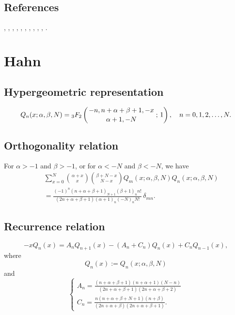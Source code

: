 \documentclass[envcountchap,graybox]{svmono}
\newcommand{\hyp}[5]{\mbox{}_{#1}{F}_{#2}
\left(\genfrac{}{}{0pt}{}{#3}{#4}\,;\,#5\right)}
\begin{document}
\subsection*{References}
\cite{Askey85}, \cite{Askey89I}, \cite{AtakRahmanSuslov},
\cite{AtakSuslov85}, \cite{Badertscher}, \cite{Gupta91}, \cite{Koelink96II},
\cite{Koorn88}, \cite{Lesky94II}, \cite{Lesky95II}, \cite{Lesky97}.


\section{Hahn}

\par\setcounter{equation}{0}

\subsection*{Hypergeometric representation}
\begin{equation}
\label{DefHahn}
Q_n(x;\alpha,\beta,N)=\hyp{3}{2}{-n,n+\alpha+\beta+1,-x}{\alpha+1,-N}{1},\quad n=0,1,2,\ldots,N.
\end{equation}

\subsection*{Orthogonality relation}
For $\alpha>-1$ and $\beta>-1$, or for $\alpha<-N$ and $\beta<-N$, we have
\begin{eqnarray}
\label{OrtHahn}
& &\sum_{x=0}^N\binom{\alpha +x}{x}\binom{\beta+N-x}{N-x}Q_m(x;\alpha,\beta,N)Q_n(x;\alpha,\beta,N)\nonumber\\
& &{}=\frac{(-1)^n(n+\alpha+\beta+1)_{N+1}(\beta+1)_nn!}{(2n+\alpha+\beta+1)(\alpha+1)_n(-N)_nN!}\,\delta_{mn}.
\end{eqnarray}

\subsection*{Recurrence relation}
\begin{equation}
\label{RecHahn}
-xQ_n(x)=A_nQ_{n+1}(x)-\left(A_n+C_n\right)Q_n(x)+C_nQ_{n-1}(x),
\end{equation}
where
$$Q_n(x):=Q_n(x;\alpha,\beta,N)$$
and
$$\left\{\begin{array}{l}
\displaystyle A_n=\frac{(n+\alpha+\beta+1)(n+\alpha+1)(N-n)}{(2n+\alpha+\beta+1)(2n+\alpha+\beta+2)}\\[5mm]
\displaystyle C_n=\frac{n(n+\alpha+\beta+N+1)(n+\beta)}{(2n+\alpha+\beta)(2n+\alpha+\beta+1)}.
\end{array}\right.$$
\end{document}
